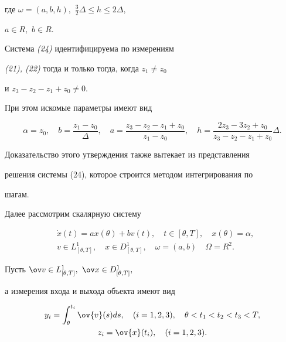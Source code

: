 где $\omega=(a, b, h),$ $\frac{3}{2}\Delta\leq h\leq 2\Delta,$


$a\in R,$ $b\in R.$





\begin{assrt} Система {\em (24)} идентифицируема по измерениям


{\em (21), (22)} тогда и только тогда, когда $z_1\ne z_0$


и $z_3-z_2-z_1+z_0\ne 0.$


При этом искомые параметры имеют вид


$$


\alpha=z_0,\quad b=\frac{z_1 - z_0}{\Delta},\quad


a=\frac{z_3-z_2-z_1+z_0}{z_1-z_0},\quad


h=\frac{2z_3-3z_2+z_0}{z_3-z_2-z_1+z_0} \Delta.


$$


\end{assrt}





Доказательство этого утверждения также вытекает из представления


решения системы (24), которое строится методом интегрирования по


шагам.





Далее рассмотрим скалярную систему


\begin{equation}


\begin{split}


& \Dot{x}(t) = a x(\theta) + b v(t),\quad t\in[\theta,T],


\quad x(\theta)=\alpha,\\


& v\in L^1_{[\theta,T]},\quad


x\in D^1_{[\theta,T]},\quad


\omega=(a,b)\quad \Omega= R^2.


\end{split}


\end{equation}


Пусть $\ov v\in L^1_{[\theta,T]},$ $\ov x\in D^1_{[\theta,T]},$


а измерения входа и выхода объекта имеют вид


\begin{gather}


y_i = \int_{\theta}^{t_i} \ov{v}(s)ds,\quad (i= 1, 2, 3),\quad


\theta<t_1<t_2<t_3<T, \\


z_i = \ov{x}(t_i),\quad (i=1, 2, 3).


\end{gather}





